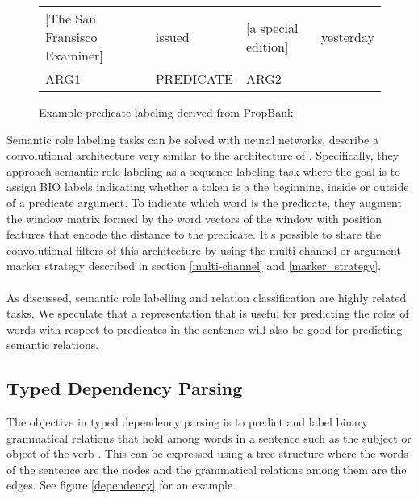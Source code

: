 \begin{figure}[h]
	\centering
	\begin{tabular}{l l l l}
		[The San Fransisco Examiner] & issued & [a special edition] & yesterday \\
		ARG1 & PREDICATE & ARG2 &
	\end{tabular}
	\caption{Example predicate labeling derived from PropBank.}
	\label{framenet}
\end{figure}
\noindent
Semantic role labeling tasks can be solved with neural networks. \citet{collobert2011} describe a convolutional architecture very similar to the architecture of \citet{nguyen2015}. Specifically, they approach semantic role labeling as a sequence labeling task where the goal is to assign BIO labels indicating whether a token is a the beginning, inside or outside of a predicate argument. To indicate which word is the predicate, they augment the window matrix formed by the word vectors of the window with position features that encode the distance to the predicate. It's possible to share the convolutional filters of this architecture by using the multi-channel or argument marker strategy described in section \ref{multi-channel} and \ref{marker_strategy}.
\\\\
As discussed, semantic role labelling and relation classification are highly related tasks. We speculate that a representation that is useful for predicting the roles of words with respect to predicates in the sentence will also be good for predicting semantic relations.

\subsection{Typed Dependency Parsing}
The objective in typed dependency parsing is to predict and label binary grammatical relations that hold among words in a sentence such as the subject or object of the verb \citep{jurafsky09}. This can be expressed using a tree structure where the words of the sentence are the nodes and the grammatical relations among them are the edges. See figure \ref{dependency} for an example.

